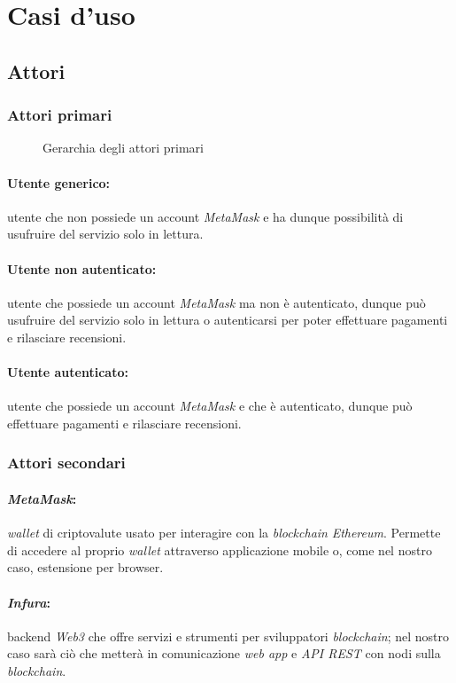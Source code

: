 \section{Casi d'uso}

\subsection{Attori}
\subsubsection{Attori primari}

\begin{figure}[htbp]
    \centering
    
    \caption{Gerarchia degli attori primari}
  \end{figure}


\paragraph*{Utente generico:} utente che non possiede un account \textit{MetaMask} e ha dunque possibilità di usufruire del servizio solo in lettura.
\paragraph*{Utente non autenticato:} utente che possiede un account \textit{MetaMask} ma non è autenticato, dunque può usufruire del servizio solo in lettura o autenticarsi per poter effettuare pagamenti e rilasciare recensioni.
\paragraph*{Utente autenticato:} utente che possiede un account \textit{MetaMask} e che è autenticato, dunque può effettuare pagamenti e rilasciare recensioni.
\subsubsection{Attori secondari}
\paragraph*{\textit{MetaMask}:} \textit{wallet}\glo\: di criptovalute usato per interagire con la \textit{blockchain} \textit{Ethereum}. Permette di accedere al proprio \textit{wallet} attraverso applicazione mobile o, come nel nostro caso, estensione per browser.
\paragraph*{\textit{Infura}\glo:} backend \textit{Web3}\glo\: che offre servizi e strumenti per sviluppatori \textit{blockchain}; nel nostro caso sarà ciò che metterà in comunicazione \textit{web app} e \textit{API REST} con nodi\glo\: sulla \textit{blockchain}.


